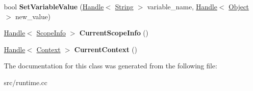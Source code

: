 \begin{DoxyCompactItemize}
\item 
\hypertarget{classv8_1_1internal_1_1_scope_iterator_a75b041ba4a4d017daea66327308f52fb}{}bool {\bfseries Set\+Variable\+Value} (\hyperlink{classv8_1_1internal_1_1_handle}{Handle}$<$ \hyperlink{classv8_1_1internal_1_1_string}{String} $>$ variable\+\_\+name, \hyperlink{classv8_1_1internal_1_1_handle}{Handle}$<$ \hyperlink{classv8_1_1internal_1_1_object}{Object} $>$ new\+\_\+value)\label{classv8_1_1internal_1_1_scope_iterator_a75b041ba4a4d017daea66327308f52fb}

\item 
\hypertarget{classv8_1_1internal_1_1_scope_iterator_a94c056c678dc1c665aed6038d52f7d84}{}\hyperlink{classv8_1_1internal_1_1_handle}{Handle}$<$ \hyperlink{classv8_1_1internal_1_1_scope_info}{Scope\+Info} $>$ {\bfseries Current\+Scope\+Info} ()\label{classv8_1_1internal_1_1_scope_iterator_a94c056c678dc1c665aed6038d52f7d84}

\item 
\hypertarget{classv8_1_1internal_1_1_scope_iterator_a9b92e59d73f45794179c4e6bafe0e289}{}\hyperlink{classv8_1_1internal_1_1_handle}{Handle}$<$ \hyperlink{classv8_1_1internal_1_1_context}{Context} $>$ {\bfseries Current\+Context} ()\label{classv8_1_1internal_1_1_scope_iterator_a9b92e59d73f45794179c4e6bafe0e289}

\end{DoxyCompactItemize}


The documentation for this class was generated from the following file\+:\begin{DoxyCompactItemize}
\item 
src/runtime.\+cc\end{DoxyCompactItemize}
